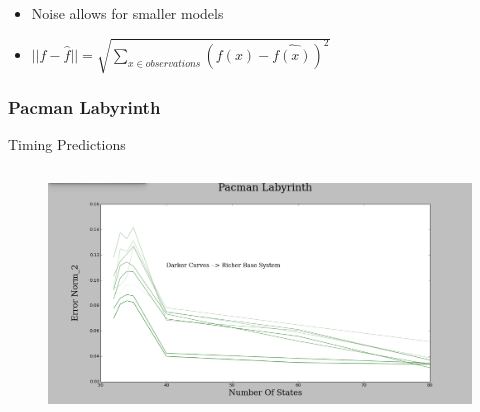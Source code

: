 \documentclass{beamer}
\begin{document}
\begin{frame}
\begin{columns}[c]
\end{columns}

\begin{itemize}
\item Noise allows for smaller models

\item $||f - \hat{f}|| = \sqrt{\sum\nolimits_{x \in observations}(f(x) - \hat{f(x)})^2}$ 
\end{itemize}

\end{frame}



\begin{frame}
\frametitle{Pacman Labyrinth}



\hspace{1cm} Timing Predictions

\begin{columns}[c]

\begin{figure}
\includegraphics[width=1.0\linewidth]{lucasplots/monImages/PacmanLabyrinth.png}
\end{figure}



\end{columns}
\end{frame}
\end{document}
